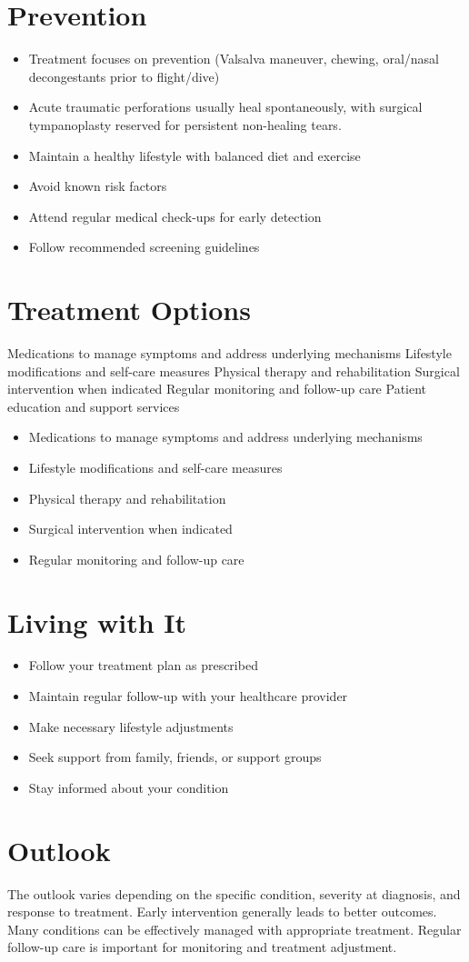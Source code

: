 \section{Prevention}
\begin{itemize}[noitemsep]
  \item Treatment focuses on prevention (Valsalva maneuver, chewing, oral/nasal decongestants prior to flight/dive)
  \item Acute traumatic perforations usually heal spontaneously, with surgical tympanoplasty reserved for persistent non-healing tears.
  \item Maintain a healthy lifestyle with balanced diet and exercise
  \item Avoid known risk factors
  \item Attend regular medical check-ups for early detection
  \item Follow recommended screening guidelines
\end{itemize}
\section{Treatment Options}
Medications to manage symptoms and address underlying mechanisms Lifestyle modifications and self-care measures Physical therapy and rehabilitation Surgical intervention when indicated Regular monitoring and follow-up care Patient education and support services

\begin{itemize}[noitemsep]
  \item Medications to manage symptoms and address underlying mechanisms
  \item Lifestyle modifications and self-care measures
  \item Physical therapy and rehabilitation
  \item Surgical intervention when indicated
  \item Regular monitoring and follow-up care
\end{itemize}
\section{Living with It}
\begin{itemize}[noitemsep]
  \item Follow your treatment plan as prescribed
  \item Maintain regular follow-up with your healthcare provider
  \item Make necessary lifestyle adjustments
  \item Seek support from family, friends, or support groups
  \item Stay informed about your condition
\end{itemize}
\section{Outlook}
The outlook varies depending on the specific condition, severity at diagnosis, and response to treatment. Early intervention generally leads to better outcomes. Many conditions can be effectively managed with appropriate treatment. Regular follow-up care is important for monitoring and treatment adjustment.
